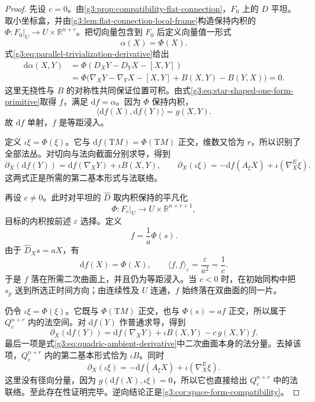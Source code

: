 \begin{proof}
	先设 \(c=0\)。由\cref{g3:prop:compatibility-flat-connection}，\(F_0\) 上的 \(D\) 平坦。取小坐标盒，并由\cref{g3:lem:flat-connection-local-frame}构造保持内积的 \(\Phi:F_0|_U\to U\times\mathbb R^{n+r}\)。把切向量包含到 \(F_0\) 后定义向量值一形式
	\[
		\alpha(X)=\Phi(X).
	\]
	式\eqref{g3:eq:parallel-trivialization-derivative}给出
	\[
		\begin{aligned}
		\mathrm d\alpha(X,Y)
		&=\Phi(D_XY-D_YX-[X,Y])\\
		&=\Phi\bigl(\nabla_XY-\nabla_YX-[X,Y]+B(X,Y)-B(Y,X)\bigr)=0.
		\end{aligned}
	\]
	这里无挠性与 \(B\) 的对称性共同保证位置可积。由式\eqref{g3:eq:star-shaped-one-form-primitive}取得 \(f\)，满足 \(\mathrm df=\alpha\)。因为 \(\Phi\) 保持内积，
	\[
		\langle\mathrm df(X),\mathrm df(Y)\rangle=g(X,Y).
	\]
	故 \(\mathrm df\) 单射，\(f\) 是等距浸入。

	定义 \(\iota\xi=\Phi(\xi)\)。它与 \(\mathrm df(\mathrm TM)=\Phi(\mathrm TM)\) 正交，维数又恰为 \(r\)，所以识别了全部法丛。对切向与法向截面分别求导，得到
	\[
		\partial_X(\mathrm df(Y))=\mathrm df(\nabla_XY)+\iota B(X,Y),
		\qquad
		\partial_X(\iota\xi)=-\mathrm df(A_\xi X)+\iota(\nabla^E_X\xi).
	\]
	这两式正是所需的第二基本形式与法联络。

	再设 \(c\ne0\)。此时对平坦的 \(\widehat D\) 取内积保持的平凡化
	\[
		\Phi:F_c|_U\longrightarrow U\times\mathbb R^{n+r+1},
	\]
	目标的内积按前述 \(\varepsilon\) 选择。定义
	\begin{equation}\label{g3:eq:quadric-immersion-from-frame}
		f=\frac1a\Phi(s).
	\end{equation}
	由于 \(\widehat D_Xs=aX\)，有
	\[
		\mathrm df(X)=\Phi(X),\qquad
		\langle f,f\rangle_\varepsilon=\frac\varepsilon{a^2}=\frac1c.
	\]
	于是 \(f\) 落在所需二次曲面上，并且仍为等距浸入。当 \(c<0\) 时，在初始同构中把 \(s_p\) 送到所选正时间方向；由连续性及 \(U\) 连通，\(f\) 始终落在双曲面的同一片。

	仍令 \(\iota\xi=\Phi(\xi)\)。它既与 \(\Phi(\mathrm TM)\) 正交，也与 \(\Phi(s)=af\) 正交，所以属于 \(Q_c^{n+r}\) 内的法空间。对 \(\mathrm df(Y)\) 作普通求导，得到
	\[
		\partial_X(\mathrm df(Y))
		=\mathrm df(\nabla_XY)+\iota B(X,Y)-c\,g(X,Y)f.
	\]
	最后一项是式\eqref{g3:eq:quadric-ambient-derivative}中二次曲面本身的法分量。去掉该项，\(Q_c^{n+r}\) 内的第二基本形式恰为 \(\iota B\)。同时
	\[
		\partial_X(\iota\xi)
		=-\mathrm df(A_\xi X)+\iota(\nabla^E_X\xi).
	\]
	这里没有径向分量，因为 \(g(\mathrm df(X),\iota\xi)=0\)，所以它也直接给出 \(Q_c^{n+r}\) 中的法联络。至此存在性证明完毕。逆向结论正是\cref{g3:cor:space-form-compatibility}。
\end{proof}

